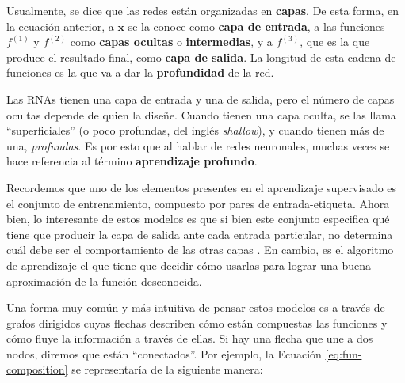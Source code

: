 \documentclass[../../main.tex]{subfiles}
\begin{document}
Usualmente, se dice que las redes están organizadas en \textbf{capas}. De esta forma, en
la ecuación anterior, a \(\bm{x}\) se la conoce como \textbf{capa de entrada}, a las
funciones \(f^{(1)}\) y \(f^{(2)}\) como \textbf{capas ocultas} o \textbf{intermedias}, y
a \(f^{(3)}\), que es la que produce el resultado final, como \textbf{capa de salida}. La
longitud de esta cadena de funciones es la que va a dar la \textbf{profundidad} de la red.

Las RNAs tienen una capa de entrada y una de salida, pero el número de capas ocultas
depende de quien la diseñe. Cuando tienen una capa oculta, se las llama ``superficiales''
(o poco profundas, del inglés \textit{shallow}), y cuando tienen más de una,
\textit{profundas}. Es por esto que al hablar de redes neuronales, muchas veces se
hace referencia al término \textbf{aprendizaje profundo}.

Recordemos que uno de los elementos presentes en el aprendizaje supervisado es el conjunto
de entrenamiento, compuesto por pares de entrada-etiqueta. Ahora bien, lo interesante de
estos modelos es que si bien este conjunto especifica qué tiene que producir la capa de
salida ante cada entrada particular, no determina cuál debe ser el comportamiento de las
otras capas \cite{deep-learning}. En cambio, es el algoritmo de aprendizaje el que tiene
que decidir cómo usarlas para lograr una buena aproximación de la función desconocida.

Una forma muy común y más intuitiva de pensar estos modelos es a través de grafos
dirigidos cuyas flechas describen cómo están compuestas las funciones y cómo fluye la
información a través de ellas. Si hay una flecha que une a dos nodos, diremos que están
``conectados''. Por ejemplo, la Ecuación \ref{eq:fun-composition} se representaría de la
siguiente manera:
\begin{center}
\end{center}
\end{document}
